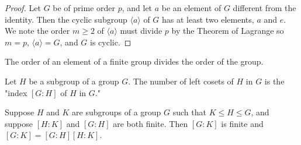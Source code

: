 \documentclass[a4paper,8pt]{article}
\begin{document}
\begin{outline}
    \begin{proof}
      Let \(G\) be of prime order \(p\), and let \(a\) be an element of \(G\) different from the identity. Then
      the cyclic subgroup \(\langle a \rangle\) of \(G\) has at least two elements, \(a\) and \(e\). We note the
      order \(m \geq 2\) of \(\langle a \rangle\) must divide \(p\) by the Theorem of Lagrange so \(m = p\),
      \(\langle a \rangle = G\), and \(G\) is cyclic.
    \end{proof}

    The order of an element of a finite group divides the order of the group.

    Let \(H\) be a subgroup of a group \(G\). The number of left cosets of \(H\) in \(G\)
    is the "index \([G:H]\) of \(H\) in \(G\)."

    Suppose \(H\) and \(K\) are subgroups of a group \(G\) such that \(K \leq H \leq G\), and suppose \([H:K]\)
    and \([G:H]\) are both finite. Then \([G:K]\) is finite and \([G:K] = [G:H][H:K]\).

\end{outline}
\end{document}
